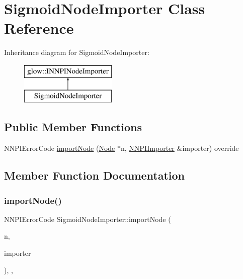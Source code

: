 \hypertarget{class_sigmoid_node_importer}{}\section{Sigmoid\+Node\+Importer Class Reference}
\label{class_sigmoid_node_importer}
Inheritance diagram for Sigmoid\+Node\+Importer\+:\begin{figure}[H]
\begin{center}
\leavevmode
\includegraphics[height=2.000000cm]{class_sigmoid_node_importer}
\end{center}
\end{figure}
\subsection*{Public Member Functions}
\begin{DoxyCompactItemize}
\item 
N\+N\+P\+I\+Error\+Code \hyperlink{class_sigmoid_node_importer_a4e60588db422209a8db359235e242144}{import\+Node} (\hyperlink{classglow_1_1_node}{Node} $\ast$n, \hyperlink{classglow_1_1_n_n_p_i_importer}{N\+N\+P\+I\+Importer} \&importer) override
\end{DoxyCompactItemize}


\subsection{Member Function Documentation}
\mbox{\label{class_sigmoid_node_importer_a4e60588db422209a8db359235e242144}} 
\subsubsection{\texorpdfstring{import\+Node()}{importNode()}}
{\footnotesize\ttfamily N\+N\+P\+I\+Error\+Code Sigmoid\+Node\+Importer\+::import\+Node (\begin{DoxyParamCaption}\item[{\hyperlink{classglow_1_1_node}{Node} $\ast$}]{n,  }\item[{\hyperlink{classglow_1_1_n_n_p_i_importer}{N\+N\+P\+I\+Importer} \&}]{importer }\end{DoxyParamCaption})\hspace{0.3cm}{\ttfamily [inline]}, {\ttfamily [override]}, {\ttfamily [virtual]}}

